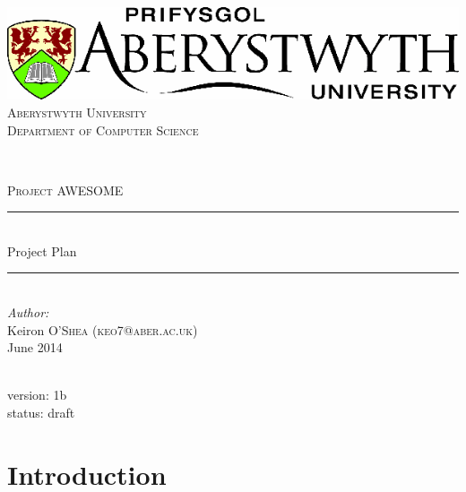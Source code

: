 \documentclass[11pt,a4paper]{article}
\begin{document}

\begin{titlepage}

\newcommand{\HRule}{\rule{\linewidth}{0.5mm}} %

\center %

\includegraphics[scale=0.4]{images/aber.png} \\[1.5cm] %
\textsc{\Large Aberystwyth University
 \\[0.5cm] Department of Computer Science}

\

\textsc{\Large Project AWESOME}\\

\HRule \\[0.4cm]
{ \huge  Project Plan}\\[0.4cm] %
\HRule \\[1.5cm]

\Large \emph{Author:}\\
Keiron \textsc{O'Shea (keo7@aber.ac.uk)}\\[1cm] %

{\large June 2014}\\[2cm] %

\


\small version: 1b \\
\small status: draft


\vfill %

\end{titlepage}

\thispagestyle{plain}	

\tableofcontents

\clearpage


\clearpage

\section{Introduction}
\end{document}
